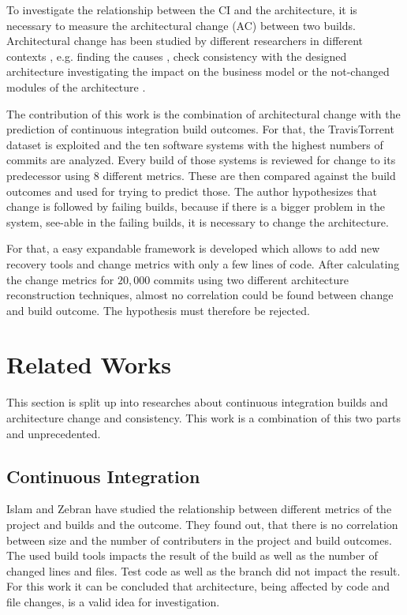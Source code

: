 \documentclass[conference]{IEEEtran}
\begin{document}
To investigate the relationship between the CI and the architecture, it is necessary to measure the architectural change (AC) between two builds. Architectural change has been studied by different researchers in different contexts \cite{Aramis,StructDist,Arc-MDSE,Arcade-Base} , e.g.  finding the causes \cite{AC-Causes}, check consistency with the designed architecture \cite{ArcConf, ArcCons} investigating the impact on the business model \cite{ArcChange-Business} or the not-changed modules of the architecture \cite{Knowledge-AC}. 

The contribution of this work is the combination of architectural change with the prediction of continuous integration build outcomes. For that, the TravisTorrent dataset is exploited and the ten software systems with the highest numbers of commits are analyzed. Every build of those systems is reviewed for change to its predecessor using 8 different metrics. These are then compared against the build outcomes and used for trying to predict those. The author hypothesizes that change is followed by failing builds, because if there is a bigger problem in the system, see-able in the failing builds, it is necessary to change the architecture. 

For that, a easy expandable framework is developed which allows to add new recovery tools and change metrics with only a few lines of code. 
After calculating the change metrics for $20,000$ commits using two different architecture reconstruction techniques, almost no correlation could be found between change and build outcome. The hypothesis must therefore be rejected. 

\section{Related Works}

This section is split up into researches about continuous integration builds and architecture change and consistency. This work is a combination of this two parts and unprecedented. 

\subsection{Continuous Integration}

Islam and Zebran \cite{FailsCorr} have studied the relationship between different metrics of the project and builds and the outcome. They found out, that there is no correlation between size and the number of contributers in the project and build outcomes. The used build tools impacts the result of the build as well as the number of changed lines and files. Test code as well as the branch did not impact the result. For this work it can be concluded that architecture, being affected by code and file changes, is a valid idea for investigation. 
\end{document}
